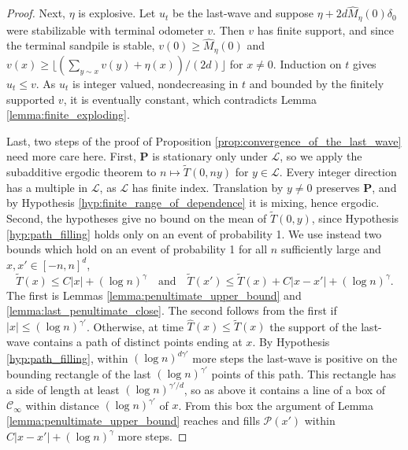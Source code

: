 \documentclass[aap]{imsart}
\begin{document}
\begin{proof}
	Next, $\eta$ is explosive. Let $u_t$ be the last-wave and suppose $\eta + 2 d \hat{M}_{\eta}(0) \delta_0$ were stabilizable with terminal odometer $v$. Then $v$ has finite support, and since the terminal sandpile is stable, $v(0) \geq \hat{M}_{\eta}(0)$ and $v(x) \geq \lfloor (\sum_{y \sim x} v(y) + \eta(x))/(2d) \rfloor$ for $x \neq 0$. Induction on $t$ gives $u_t \leq v$. As $u_t$ is integer valued, nondecreasing in $t$ and bounded by the finitely supported $v$, it is eventually constant, which contradicts Lemma \ref{lemma:finite_exploding}. 

	Last, two steps of the proof of Proposition \ref{prop:convergence_of_the_last_wave} need more care here. First, $\mathbf{P}$ is stationary only under $\mathcal{L}$, so we apply the subadditive ergodic theorem to $n \mapsto \tilde{T}(0, n y)$ for $y \in \mathcal{L}$. Every integer direction has a multiple in $\mathcal{L}$, as $\mathcal{L}$ has finite index. Translation by $y \neq 0$ preserves $\mathbf{P}$, and by Hypothesis \ref{hyp:finite_range_of_dependence} it is mixing, hence ergodic. Second, the hypotheses give no bound on the mean of $\tilde{T}(0,y)$, since Hypothesis \ref{hyp:path_filling} holds only on an event of probability 1. We use instead two bounds which hold on an event of probability 1 for all $n$ sufficiently large and $x, x' \in [-n,n]^d$,
	\begin{equation} \label{eq:generalized_lipschitz}
	\tilde{T}(x) \leq C |x| + (\log n)^{\gamma} \quad \mbox{and} \quad \tilde{T}(x') \leq \tilde{T}(x) + C|x - x'| + (\log n)^{\gamma}.
	\end{equation}
	The first is Lemmas \ref{lemma:penultimate_upper_bound} and \ref{lemma:last_penultimate_close}. The second follows from the first if $|x| \leq (\log n)^{\gamma'}$. Otherwise, at time $\hat{T}(x) \leq \tilde{T}(x)$ the support of the last-wave contains a path of distinct points ending at $x$. By Hypothesis \ref{hyp:path_filling}, within $(\log n)^{d \gamma'}$ more steps the last-wave is positive on the bounding rectangle of the last $(\log n)^{\gamma'}$ points of this path. This rectangle has a side of length at least $(\log n)^{\gamma'/d}$, so as above it contains a line of a box of $\mathcal{C}_{\infty}$ within distance $(\log n)^{\gamma'}$ of $x$. From this box the argument of Lemma \ref{lemma:penultimate_upper_bound} reaches and fills $\mathcal{P}(x')$ within $C|x - x'| + (\log n)^{\gamma}$ more steps. 

\end{proof}
\end{document}
